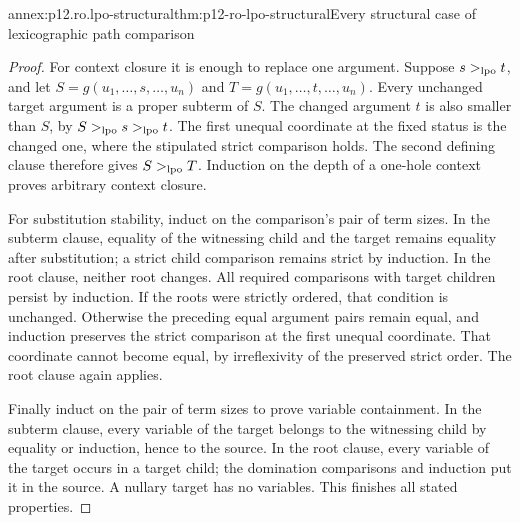 \begin{annexitem}{annex:p12.ro.lpo-structural}{thm:p12-ro-lpo-structural}{Every structural case of lexicographic path comparison}
\begin{proof}
For context closure it is enough to replace one argument. Suppose
\(s>_{\rm lpo}t\), and let \(S=g(u_1,\ldots,s,\ldots,u_n)\)
and \(T=g(u_1,\ldots,t,\ldots,u_n)\). Every unchanged target
argument is a proper subterm of \(S\). The changed argument \(t\)
is also smaller than \(S\), by \(S>_{\rm lpo}s>_{\rm lpo}t\).
The first unequal coordinate at the fixed status is the changed one,
where the stipulated strict comparison holds. The second defining
clause therefore gives \(S>_{\rm lpo}T\). Induction on the depth
of a one-hole context proves arbitrary context closure.

For substitution stability, induct on the comparison's pair of term
sizes. In the subterm clause, equality of the witnessing child and
the target remains equality after substitution; a strict child
comparison remains strict by induction. In the root clause, neither
root changes. All required comparisons with target children persist
by induction. If the roots were strictly ordered, that condition is
unchanged. Otherwise the preceding equal argument pairs remain equal,
and induction preserves the strict comparison at the first unequal
coordinate. That coordinate cannot become equal, by irreflexivity of
the preserved strict order. The root clause again applies.

Finally induct on the pair of term sizes to prove variable containment.
In the subterm clause, every variable of the target belongs to the
witnessing child by equality or induction, hence to the source. In
the root clause, every variable of the target occurs in a target child;
the domination comparisons and induction put it in the source. A
nullary target has no variables. This finishes all stated properties.
\end{proof}
\end{annexitem}

